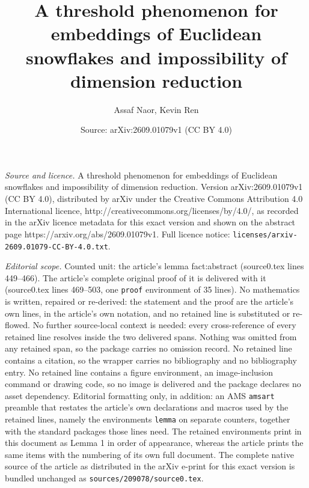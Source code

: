 \documentclass[10pt,a4paper]{amsart}
\title{A threshold phenomenon for embeddings of Euclidean snowflakes and impossibility of dimension reduction}
\author{Assaf Naor, Kevin Ren}
\date{Source: arXiv:2609.01079v1 (CC BY 4.0)}
\begin{document}
\maketitle

\noindent\emph{Source and licence.} A threshold phenomenon for embeddings of Euclidean snowflakes and impossibility of dimension reduction. Version arXiv:2609.01079v1 (CC BY 4.0), distributed by arXiv under the Creative Commons Attribution 4.0 International licence, http://creativecommons.org/licenses/by/4.0/, as recorded in the arXiv licence metadata for this exact version and shown on the abstract page https://arxiv.org/abs/2609.01079v1. Full licence notice: \texttt{licenses/arxiv-2609.01079-CC-BY-4.0.txt}.\par\smallskip

\noindent\textit{Editorial scope.} Counted unit: the article's lemma fact:abstract (source0.tex lines 449--466). The article's complete original proof of it is delivered with it (source0.tex lines 469--503, one \texttt{proof} environment of 35 lines). No mathematics is written, repaired or re-derived: the statement and the proof are the article's own lines, in the article's own notation, and no retained line is substituted or re-flowed.  No further source-local context is needed: every cross-reference of every retained line resolves inside the two delivered spans.  Nothing was omitted from any retained span, so the package carries no omission record.  No retained line contains a citation, so the wrapper carries no bibliography and no bibliography entry.  No retained line contains a figure environment, an image-inclusion command or drawing code, so no image is delivered and the package declares no asset dependency.  Editorial formatting only, in addition: an AMS \texttt{amsart} preamble that restates the article's own declarations and macros used by the retained lines, namely the environments \texttt{lemma} on separate counters, together with the standard packages those lines need.  The retained environments print in this document as Lemma 1 in order of appearance, whereas the article prints the same items with the numbering of its own full document.  The complete native source of the article as distributed in the arXiv e-print for this exact version is bundled unchanged as \texttt{sources/209078/source0.tex}.
\end{document}

